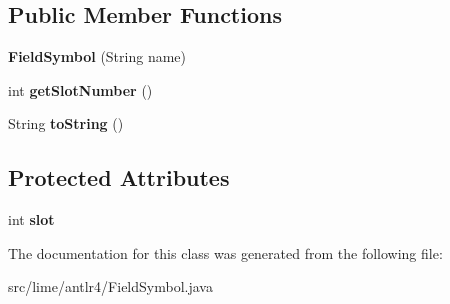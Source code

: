 \subsection*{Public Member Functions}
\begin{DoxyCompactItemize}
\item 
\mbox{\label{classlime_1_1antlr4_1_1FieldSymbol_a717718bd57c2f6caeee12bfc0ba3374a}} 
{\bfseries Field\+Symbol} (String name)
\item 
\mbox{\label{classlime_1_1antlr4_1_1FieldSymbol_a5ce9ad14aa8f9f11726ac4dc492f4d2e}} 
int {\bfseries get\+Slot\+Number} ()
\item 
\mbox{\label{classlime_1_1antlr4_1_1FieldSymbol_a65e351376bb4ad9fd477dff778975c75}} 
String {\bfseries to\+String} ()
\end{DoxyCompactItemize}
\subsection*{Protected Attributes}
\begin{DoxyCompactItemize}
\item 
\mbox{\label{classlime_1_1antlr4_1_1FieldSymbol_a56c46907abe7bf78b27359efea2ec4b5}} 
int {\bfseries slot}
\end{DoxyCompactItemize}


The documentation for this class was generated from the following file\+:\begin{DoxyCompactItemize}
\item 
src/lime/antlr4/Field\+Symbol.\+java\end{DoxyCompactItemize}

